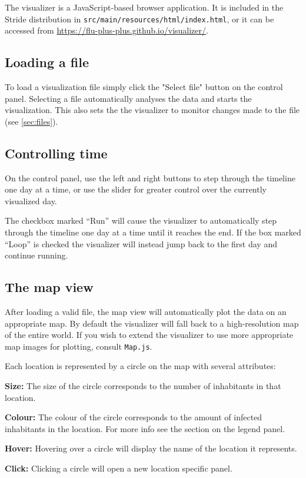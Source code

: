 The visualizer is a JavaScript-based browser application. It is included in the Stride distribution in \texttt{src/main/resources/html/index.html}, or it can be accessed from \url{https://flu-plus-plus.github.io/visualizer/}.


\subsection{Loading a file}

To load a visualization file simply click the "Select file" button on the control panel. Selecting a file automatically analyses the data and starts the visualization. This also sets the the visualizer to monitor changes made to the file (see \ref{sec:files}).

\subsection{Controlling time}
\label{sub:control}

On the control panel, use the left and right buttons to step through the timeline one day at a time, or use the slider for greater control over the currently visualized day.

The checkbox marked ``{Run}'' will cause the visualizer to automatically step through the timeline one day at a time until it reaches the end. If the box marked ``{Loop}'' is checked the visualizer will instead jump back to the first day and continue running.


\subsection{The map view}

After loading a valid file, the map view will automatically plot the data on an appropriate map. By default the visualizer will fall back to a high-resolution map of the entire world. If you wish to extend the visualizer to use more appropriate map images for plotting, consult \texttt{Map.js}.

Each location is represented by a circle on the map with several attributes:

\begin{compactitem}

\item \textbf{Size:} The size of the circle corresponds to the number of inhabitants in that location.
\item \textbf{Colour:} The colour of the circle corresponds to the amount of infected inhabitants in the location. For more info see the section on the legend panel.
\item \textbf{Hover:} Hovering over a circle will display the name of the location it represents.
\item \textbf{Click:} Clicking a circle will open a new location specific panel.

\end{compactitem}

